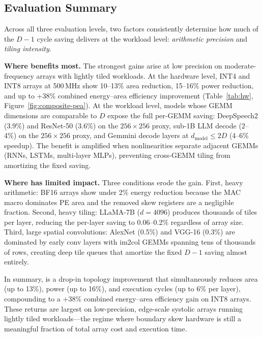 \subsection{Evaluation Summary}

Across all three evaluation levels, two factors consistently determine
how much of the $D{-}1$ cycle saving \pipette{} delivers at the
workload level: \emph{arithmetic precision} and \emph{tiling intensity}.

\textbf{Where \pipette{} benefits most.}
The strongest gains arise at low precision on moderate-frequency arrays
with lightly tiled workloads. At the hardware level, INT4 and INT8 arrays
at 500\,MHz show 10--13\% area reduction, 15--16\% power reduction, and
up to +38\% combined energy--area efficiency improvement
(Table~\ref{tab:hw}, Figure~\ref{fig:composite-pea}). At the workload
level, models whose GEMM dimensions are comparable to $D$ expose the
full per-GEMM saving: DeepSpeech2 (3.9\%) and ResNet-50 (3.6\%) on the
$256{\times}256$ proxy, sub-1B LLM decode (2--4\%) on the
$256{\times}256$ proxy, and Gemmini decode layers at $d_\text{model}
\leq 2D$ (4--6\% speedup). The benefit is amplified when nonlinearities
separate adjacent GEMMs (RNNs, LSTMs, multi-layer MLPs), preventing
cross-GEMM tiling from amortizing the fixed saving.

\textbf{Where \pipette{} has limited impact.}
Three conditions erode the gain. First, heavy arithmetic: BF16 arrays
show under 2\% energy reduction because the MAC macro dominates PE area
and the removed skew registers are a negligible fraction. Second, heavy
tiling: LLaMA-7B ($d{=}4096$) produces thousands of tiles per layer,
reducing the per-layer saving to 0.06--0.2\% regardless of array size.
Third, large spatial convolutions: AlexNet (0.5\%) and VGG-16 (0.3\%)
are dominated by early conv layers with im2col GEMMs spanning tens of
thousands of rows, creating deep tile queues that amortize the fixed
$D{-}1$ saving almost entirely.

In summary, \pipette{} is a drop-in topology improvement that
simultaneously reduces area (up to 13\%), power (up to 16\%), and
execution cycles (up to 6\% per layer), compounding to a +38\% combined
energy--area efficiency gain on INT8 arrays. These returns are largest on
low-precision, edge-scale systolic arrays running lightly tiled
workloads---the regime where boundary skew hardware is still a
meaningful fraction of total array cost and execution time.
